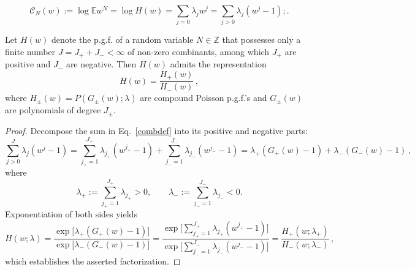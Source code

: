 \documentclass[10pt,a4paper]{amsart}
\newcommand{\E}{\mathbb{E}}
\begin{document}
\begin{equation}\label{combdef}
 \mathcal{C}_N(w):= \log \E w^N= \log H(w)=\sum_{j=0} \lambda_j w^j=\sum_{j>0}\lambda_j( w^j -1);.
\end{equation}

\begin{Proposition}\label{fincumul}
Let $H(w)$ denote the p.g.f. of a random variable $N \in \mathbb{Z}$ that possesses only a finite number $J = J_{+} + J_{-} < \infty$ of non-zero combinants, among which $J_{+}$ are positive and $J_{-}$ are negative. Then $H(w)$ admits the representation
\[
H(w) = \frac{H_{+}(w)}{H_{-}(w)}\,,
\]
where $H_{\pm}(w) = P(G_{\pm}(w);\lambda)$ are compound Poisson p.g.f.'s and $G_{\pm}(w)$ are polynomials of degree $J_{\pm}$.
\end{Proposition}

\begin{proof}
Decompose the sum in Eq.~\ref{combdef} into its positive and negative parts:
\[
\sum_{j>0}^{J} \lambda_j (w^j - 1)
=
\sum_{j_{+}=1}^{J_{+}} \lambda_{j_{+}} (w^{j_{+}} - 1)
+
\sum_{j_{-}=1}^{J_{-}} \lambda_{j_{-}} (w^{j_{-}} - 1)
=
\lambda_{+} (G_{+}(w) - 1) + \lambda_{-} (G_{-}(w) - 1)\,,
\]
where
\[
\lambda_{+} := \sum_{j_{+}=1}^{J_{+}} \lambda_{j_{+}} > 0,
\qquad
\lambda_{-} := \sum_{j_{-}=1}^{J_{-}} \lambda_{j_{-}} < 0.
\]
Exponentiation of both sides yields
\begin{equation}\label{infdratio}
H(w;\lambda)
=
\frac{\exp\bigl[\lambda_{+}(G_{+}(w) - 1)\bigr]}
     {\exp\bigl[\lambda_{-}(G_{-}(w) - 1)\bigr]}
=
\frac{\exp\bigl[\sum_{j_{+}=1}^{J_{+}} \lambda_{j_{+}} (w^{j_{+}} - 1)\bigr]}
     {\exp\bigl[\sum_{j_{-}=1}^{J_{-}} \lambda_{j_{-}} (w^{j_{-}} - 1)\bigr]}
=
\frac{H_{+}(w;\lambda_{+})}{H_{-}(w;\lambda_{-})}\,,
\end{equation}
which establishes the asserted factorization.
\end{proof}  
\end{document}
